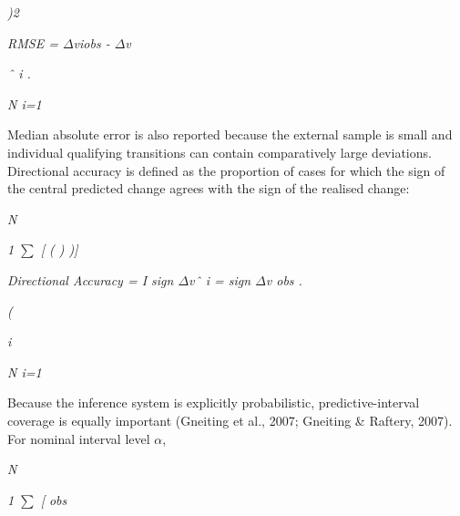 \begin{center}\textit{                      )2}\end{center}

\begin{center}\textit{RMSE =          \ensuremath{\Delta}viobs - \ensuremath{\Delta}v}\end{center}

\begin{center}\textit{ˆ i .}\end{center}

\begin{center}\textit{N i=1}\end{center}

Median absolute error is also reported because the external sample is small and individual qualifying transitions can contain comparatively large deviations. Directional accuracy is defined as the proportion of cases for which the sign of the central predicted change agrees with the sign of the realised change:

\begin{center}\textit{N}\end{center}

\begin{center}\textit{1 \ensuremath{\sum} [     (     )            )]}\end{center}

\begin{center}\textit{Directional Accuracy =          I sign \ensuremath{\Delta}vˆ i = sign \ensuremath{\Delta}v obs .}\end{center}

\begin{center}\textit{(}\end{center}

\begin{center}\textit{i}\end{center}

\begin{center}\textit{N i=1}\end{center}

Because the inference system is explicitly probabilistic, predictive-interval coverage is equally important (Gneiting et al., 2007; Gneiting \& Raftery, 2007). For nominal interval level \ensuremath{\alpha},

\begin{center}\textit{N}\end{center}

\begin{center}\textit{1 \ensuremath{\sum} [ obs}\end{center}

